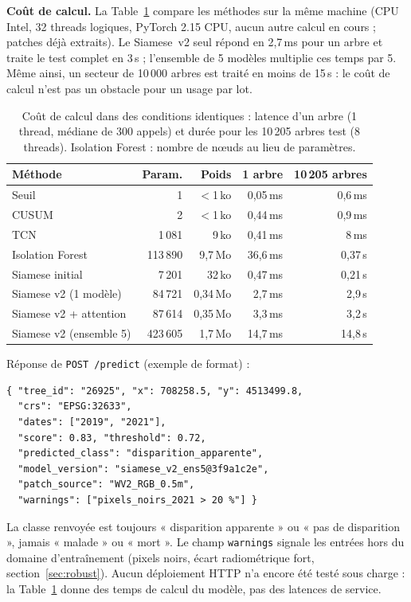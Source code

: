 \documentclass[10pt,a4paper,twocolumn]{article}
\begin{document}
\textbf{Coût de calcul.} La Table~\ref{tab:bench} compare les méthodes sur la même machine (CPU Intel, 32 threads logiques,
PyTorch 2.15 CPU, aucun autre calcul en cours ; patches déjà extraits). Le Siamese~v2 seul répond en 2,7\,ms pour un arbre et
traite le test complet en 3\,s ; l'ensemble de 5 modèles multiplie ces temps par 5. Même ainsi, un secteur de 10\,000 arbres
est traité en moins de 15\,s : le coût de calcul n'est pas un obstacle pour un usage par lot.

\begin{table}[t]
\centering\small
\caption{Coût de calcul dans des conditions identiques : latence d'un arbre (1 thread, médiane de 300 appels) et durée
pour les 10\,205 arbres test (8 threads). Isolation Forest : nombre de nœuds au lieu de paramètres.}
\label{tab:bench}
\footnotesize\setlength{\tabcolsep}{2.5pt}
\begin{tabular}{@{}lrrrr@{}}
\toprule
Méthode & Param. & Poids & 1 arbre & 10\,205 arbres \\
\midrule
Seuil & 1 & $<$1\,ko & 0,05\,ms & 0,6\,ms \\
CUSUM & 2 & $<$1\,ko & 0,44\,ms & 0,9\,ms \\
TCN & 1\,081 & 9\,ko & 0,41\,ms & 8\,ms \\
Isolation Forest & 113\,890 & 9,7\,Mo & 36,6\,ms & 0,37\,s \\
Siamese initial & 7\,201 & 32\,ko & 0,47\,ms & 0,21\,s \\
Siamese v2 (1 modèle) & 84\,721 & 0,34\,Mo & 2,7\,ms & 2,9\,s \\
Siamese v2 + attention & 87\,614 & 0,35\,Mo & 3,3\,ms & 3,2\,s \\
Siamese v2 (ensemble 5) & 423\,605 & 1,7\,Mo & 14,7\,ms & 14,8\,s \\
\bottomrule
\end{tabular}
\end{table}

\noindent Réponse de \texttt{POST /predict} (exemple de format) :
{\footnotesize
\begin{verbatim}
{ "tree_id": "26925", "x": 708258.5, "y": 4513499.8,
  "crs": "EPSG:32633",
  "dates": ["2019", "2021"],
  "score": 0.83, "threshold": 0.72,
  "predicted_class": "disparition_apparente",
  "model_version": "siamese_v2_ens5@3f9a1c2e",
  "patch_source": "WV2_RGB_0.5m",
  "warnings": ["pixels_noirs_2021 > 20 %"] }
\end{verbatim}
}
\noindent La classe renvoyée est toujours « disparition apparente » ou « pas de disparition », jamais « malade » ou « mort ».
Le champ \texttt{warnings} signale les entrées hors du domaine d'entraînement (pixels noirs, écart radiométrique fort,
section~\ref{sec:robust}). Aucun déploiement HTTP n'a encore été testé sous charge : la Table~\ref{tab:bench} donne des temps
de calcul du modèle, pas des latences de service.
\end{document}
